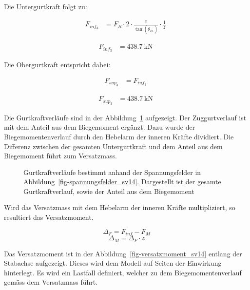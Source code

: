 \documentclass[
  11pt,
  letterpaper,
]{scrreprt}
\begin{document}
Die Untergurtkraft folgt zu:

$$
\begin{aligned}
F_{inf_{3}} &= F_{B} \cdot 2 \cdot \frac{ z_{_{}} }{ \tan \left( \theta_{c3_{_{}}} \right) } \cdot \frac{1} { z_{_{}} } \; 
\end{aligned}
$$

$$
\begin{aligned}
F_{inf_{3}} &= 438.7\ \mathrm{kN} \;
\end{aligned}
$$

Die Obergurtkraft entspricht dabei:

$$
\begin{aligned}
F_{sup_{3}} &= F_{inf_{3}} \; 
\end{aligned}
$$

$$
\begin{aligned}
F_{sup_{3}} &= 438.7\ \mathrm{kN} \;
\end{aligned}
$$

Die Gurtkraftverläufe sind in der Abbildung~\ref{fig-gurtkraft_sv14}
aufgezeigt. Der Zuggurtverlauf ist mit dem Anteil aus dem Biegemoment
ergänzt. Dazu wurde der Biegemomentenverlauf durch den Hebelarm der
inneren Kräfte dividiert. Die Differenz zwischen der gesamten
Untergurtkraft und dem Anteil aus dem Biegemoment führt zum Versatzmass.

\begin{figure}[H]


\caption{\label{fig-gurtkraft_sv14}Gurtkraftverläufe bestimmt anhand der
Spannungsfelder in Abbildung~\ref{fig-spannungsfelder_sv14}. Dargestellt
ist der gesamte Gurtkraftverlauf, sowie der Anteil aus dem Biegemoment}

\end{figure}%

Wird das Versatzmass mit dem Hebelarm der inneren Kräfte multipliziert,
so resultiert das Versatzmoment.

\[
\Delta_F = F_{inf} - F_M
\] \[
\Delta_M = \Delta_F \cdot z
\]

Das Versatzmoment ist in der Abbildung~\ref{fig-versatzmoment_sv14}
entlang der Stabachse aufgezeigt. Dieses wird dem Modell auf Seiten der
Einwirkung hinterlegt. Es wird ein Lastfall definiert, welcher zu dem
Biegemomentenverlauf gemäss dem Versatzmass führt.
\end{document}
